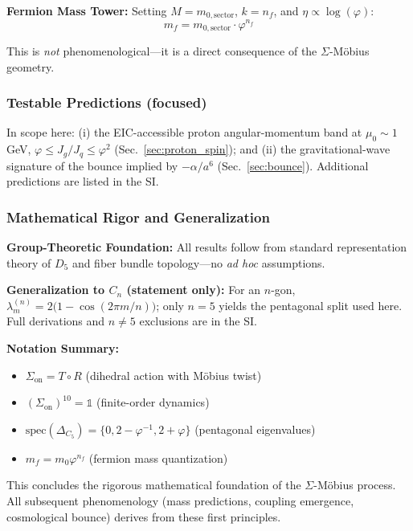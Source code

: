 \documentclass[12pt]{article}
\begin{document}
\textbf{Fermion Mass Tower:} Setting $M = m_{0,\text{sector}}$, $k = n_f$, and $\eta \propto \log(\varphi)$:
\begin{equation}
\boxed{m_f = m_{0,\text{sector}} \cdot \varphi^{n_f}}
\end{equation}

This is \textit{not} phenomenological—it is a direct consequence of the $\Sigma$-M\"obius geometry.

\subsubsection{Testable Predictions (focused)}
In scope here: (i) the EIC-accessible proton angular-momentum band at $\mu_0\!\sim\!1$ GeV, \(\varphi \le J_g/J_q \le \varphi^2\) (Sec.~\ref{sec:proton_spin}); and (ii) the gravitational-wave signature of the bounce implied by $-\alpha/a^6$ (Sec.~\ref{sec:bounce}). Additional predictions are listed in the SI.

\subsubsection{Mathematical Rigor and Generalization}

\textbf{Group-Theoretic Foundation:} All results follow from standard representation theory of $D_5$ and fiber bundle topology—no \textit{ad hoc} assumptions.

\textbf{Generalization to $C_n$ (statement only):} For an $n$-gon, $\lambda_m^{(n)} = 2\big(1 - \cos(2\pi m/n)\big)$; only $n=5$ yields the pentagonal split used here. Full derivations and $n\neq5$ exclusions are in the SI.

\textbf{Notation Summary:}
\begin{itemize}
\item $\Sigma_{\text{on}} = T \circ R$ (dihedral action with M\"obius twist)
\item $(\Sigma_{\text{on}})^{10} = \mathbb{1}$ (finite-order dynamics)
\item $\text{spec}(\Delta_{C_5}) = \{0, 2 - \varphi^{-1}, 2 + \varphi\}$ (pentagonal eigenvalues)
\item $m_f = m_0 \varphi^{n_f}$ (fermion mass quantization)
\end{itemize}

This concludes the rigorous mathematical foundation of the $\Sigma$-M\"obius process. All subsequent phenomenology (mass predictions, coupling emergence, cosmological bounce) derives from these first principles.
\end{document}
